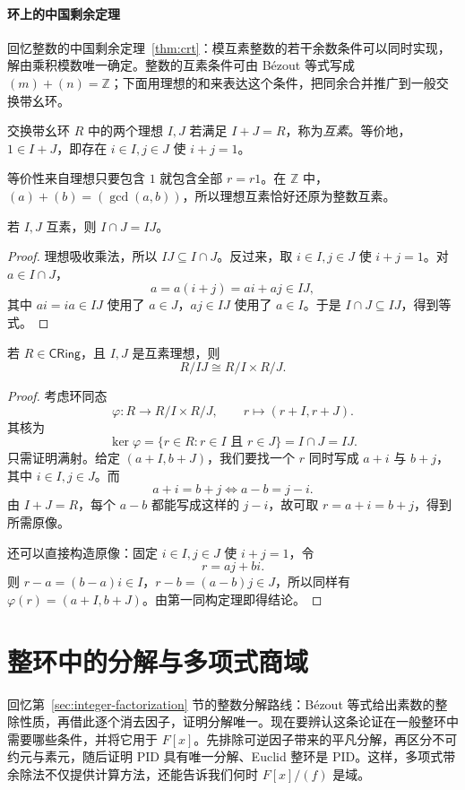 \documentclass[lang=cn,a4paper,fontset=none,zihao=false,10pt,openany,twoside]{beautybook}
\numberwithin{algorithm}{chapter}
\begin{document}
\paragraph{环上的中国剩余定理}
回忆整数的中国剩余定理~\ref{thm:crt}：模互素整数的若干余数条件可以同时实现，解由乘积模数唯一确定。整数的互素条件可由 Bézout 等式写成 $(m)+(n)=\mathbb Z$；下面用理想的和来表达这个条件，把同余合并推广到一般交换带幺环。
\begin{definition}[互素理想]
交换带幺环 $R$ 中的两个理想 $I,J$ 若满足 $I+J=R$，称为\emph{互素}。等价地，$1\in I+J$，即存在 $i\in I,j\in J$ 使 $i+j=1$。
\end{definition}
等价性来自理想只要包含 $1$ 就包含全部 $r=r1$。在 $\mathbb Z$ 中，$(a)+(b)=(\gcd(a,b))$，所以理想互素恰好还原为整数互素。
\begin{lemma}
若 $I,J$ 互素，则 $I\cap J=IJ$。
\end{lemma}
\begin{proof}
理想吸收乘法，所以 $IJ\subseteq I\cap J$。反过来，取 $i\in I,j\in J$ 使 $i+j=1$。对 $a\in I\cap J$，
\[
 a=a(i+j)=ai+aj\in IJ,
\]
其中 $ai=ia\in IJ$ 使用了 $a\in J$，$aj\in IJ$ 使用了 $a\in I$。于是 $I\cap J\subseteq IJ$，得到等式。
\end{proof}
\begin{theorem}[环上的中国剩余定理]\label{thm:ring-crt}
若 $R\in\mathsf{CRing}$，且 $I,J$ 是互素理想，则
\[
 R/IJ\cong R/I\times R/J.
\]
\end{theorem}
\begin{proof}
考虑环同态
\[
 \varphi:R\longrightarrow R/I\times R/J,\qquad
 r\longmapsto(r+I,r+J).
\]
其核为
\[
 \ker\varphi=\{r\in R:r\in I\text{ 且 }r\in J\}=I\cap J=IJ.
\]
只需证明满射。给定 $(a+I,b+J)$，我们要找一个 $r$ 同时写成 $a+i$ 与 $b+j$，其中 $i\in I,j\in J$。而
\[
 a+i=b+j\Longleftrightarrow a-b=j-i.
\]
由 $I+J=R$，每个 $a-b$ 都能写成这样的 $j-i$，故可取 $r=a+i=b+j$，得到所需原像。

还可以直接构造原像：固定 $i\in I,j\in J$ 使 $i+j=1$，令
\[
 r=aj+bi.
\]
则 $r-a=(b-a)i\in I$，$r-b=(a-b)j\in J$，所以同样有 $\varphi(r)=(a+I,b+J)$。由第一同构定理即得结论。
\end{proof}

\section{整环中的分解与多项式商域}\label{sec:factorization-route}
回忆第~\ref{sec:integer-factorization} 节的整数分解路线：Bézout 等式给出素数的整除性质，再借此逐个消去因子，证明分解唯一。现在要辨认这条论证在一般整环中需要哪些条件，并将它用于 $F[x]$。先排除可逆因子带来的平凡分解，再区分不可约元与素元，随后证明 PID 具有唯一分解、Euclid 整环是 PID。这样，多项式带余除法不仅提供计算方法，还能告诉我们何时 $F[x]/(f)$ 是域。
\end{document}
